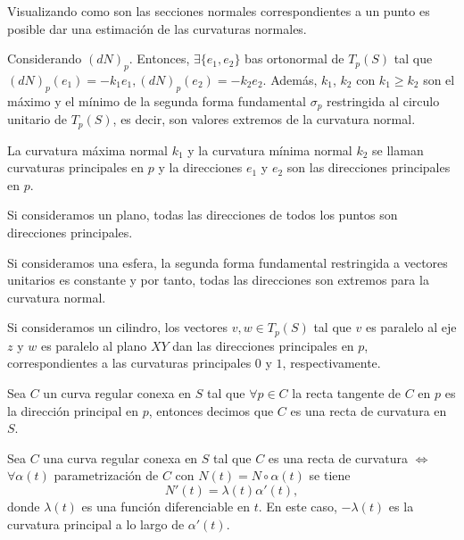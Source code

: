 \begin{obs}
  Visualizando como son las secciones normales correspondientes a un punto es posible dar una estimación de las curvaturas normales.
\end{obs}

\begin{note}
  Considerando $(d N)_{p}$. Entonces, $\exists \{ e_{1}, e_{2} \}$ bas ortonormal de $T_{p}(S)$ tal que $(d N)_{p}(e_{1}) = - k_{1} e_{1}, (d N)_{p}(e_{2}) = - k_{2} e_{2}$. Además, $k_{1}$, $k_{2}$ con $k_{1} \geq k_{2}$ son el máximo y el mínimo de la segunda forma fundamental $\sigma_{p}$ restringida al circulo unitario de $T_{p}(S)$, es decir, son valores extremos de la curvatura normal.
\end{note}

\begin{defn}
  La curvatura máxima normal $k_{1}$ y la curvatura mínima normal $k_{2}$ se llaman curvaturas principales en $p$ y la direcciones $e_{1}$ y $e_{2}$ son las direcciones principales en $p$.
\end{defn}

\begin{ejm}[Plano]
  Si consideramos un plano, todas las direcciones de todos los puntos son direcciones principales.
\end{ejm}

\begin{ejm}[Esfera]
  Si consideramos una esfera, la segunda forma fundamental restringida a vectores unitarios es constante y por tanto, todas las direcciones son extremos para la curvatura normal.
\end{ejm}

\begin{ejm}[Cilindro]
  Si consideramos un cilindro, los vectores $v,w \in T_{p}(S)$ tal que $v$ es paralelo al eje $z$ y $w$ es paralelo al plano $XY$ dan las direcciones principales en $p$, correspondientes a las curvaturas principales $0$ y $1$, respectivamente.
\end{ejm}

\begin{defn}
  Sea $C$ un curva regular conexa en $S$ tal que $\forall p \in C$ la recta tangente de $C$ en $p$ es la dirección principal en $p$, entonces decimos que $C$ es una recta de curvatura en $S$.
\end{defn}

\begin{prop}
  Sea $C$ una curva regular conexa en $S$ tal que $C$ es una recta de curvatura $\Leftrightarrow$ $\forall \alpha(t)$ parametrización de $C$ con $N(t) = N \circ \alpha(t)$ se tiene
  \[ 
    N'(t) = \lambda(t) \alpha'(t),
  \] 
  donde $\lambda(t)$ es una función diferenciable en $t$. En este caso, $-\lambda(t)$ es la curvatura principal a lo largo de $\alpha'(t)$.
\end{prop}

